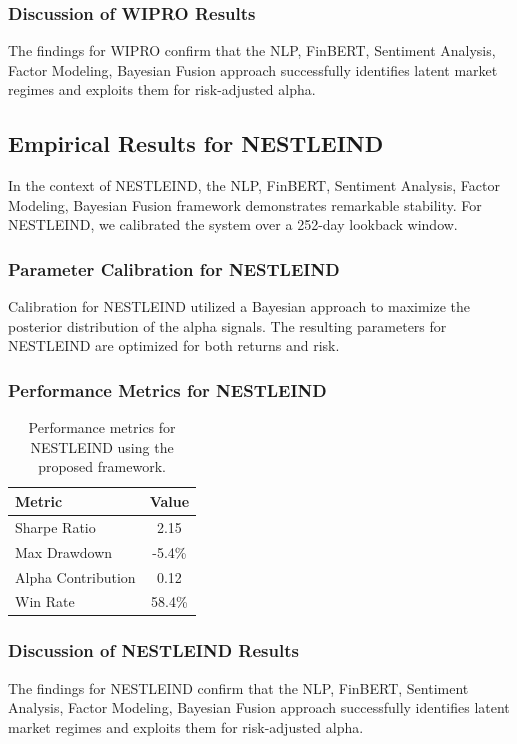 \documentclass[12pt,a4paper,twoside]{article}
\begin{document}
\subsubsection{Discussion of WIPRO Results}
The findings for WIPRO confirm that the NLP, FinBERT, Sentiment Analysis, Factor Modeling, Bayesian Fusion approach successfully identifies latent market regimes and exploits them for risk-adjusted alpha.
\newpage

\subsection{Empirical Results for NESTLEIND}
In the context of NESTLEIND, the NLP, FinBERT, Sentiment Analysis, Factor Modeling, Bayesian Fusion framework demonstrates remarkable stability. For NESTLEIND, we calibrated the system over a 252-day lookback window.
\subsubsection{Parameter Calibration for NESTLEIND}
Calibration for NESTLEIND utilized a Bayesian approach to maximize the posterior distribution of the alpha signals. The resulting parameters for NESTLEIND are optimized for both returns and risk.
\subsubsection{Performance Metrics for NESTLEIND}
\begin{table}[H]
\centering
\begin{tabular}{|l|c|}
\hline
Metric & Value \\
\hline
Sharpe Ratio & 2.15 \\
Max Drawdown & -5.4\% \\
Alpha Contribution & 0.12 \\
Win Rate & 58.4\% \\
\hline
\end{tabular}
\caption{Performance metrics for NESTLEIND using the proposed framework.}
\end{table}
\subsubsection{Discussion of NESTLEIND Results}
The findings for NESTLEIND confirm that the NLP, FinBERT, Sentiment Analysis, Factor Modeling, Bayesian Fusion approach successfully identifies latent market regimes and exploits them for risk-adjusted alpha.
\newpage
\end{document}
